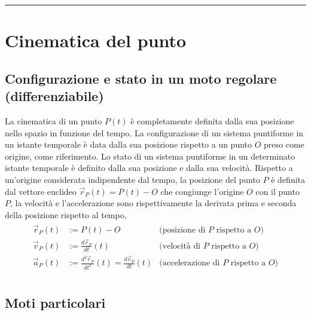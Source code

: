 \documentclass[letterpaper,10pt,italian]{jupyterBook}
\begin{document}
\bigskip\hrule\bigskip


\sphinxstepscope




\section{Cinematica del punto}
\label{\detokenize{ch/mechanics/kinematics-point:cinematica-del-punto}}\label{\detokenize{ch/mechanics/kinematics-point:physics-hs-mechanics-kinematics-point}}\label{\detokenize{ch/mechanics/kinematics-point::doc}}



\subsection{Configurazione e stato in un moto regolare (differenziabile)}
\label{\detokenize{ch/mechanics/kinematics-point:configurazione-e-stato-in-un-moto-regolare-differenziabile}}
\sphinxAtStartPar
La cinematica di un punto \(P(t)\) è completamente definita dalla sua posizione nello spazio in funzione del tempo. La configurazione di un sistema puntiforme in un istante temporale è data dalla sua posizione rispetto a un punto \(O\) preso come origine, come riferimento. Lo stato di un sistema puntiforme in un determinato istante temporale è definito dalla sua posizione e dalla sua velocità. Rispetto a un’origine considerata indipendente dal tempo, la posizione del punto \(P\) è definita dal vettore euclideo \(\vec{r}_P(t) = P(t) - O\) che congiunge l’origine \(O\) con il punto \(P\), la velocità e l’accelerazione sono rispettivamente la derivata prima e seconda della posizione rispetto al tempo,
\begin{equation*}
\begin{split}\begin{aligned}
   \vec{r}_P(t) & := P(t) - O & \text{(posizione di $P$ rispetto a $O$)} \\
   \vec{v}_P(t) & := \frac{d \vec{r}_P}{dt}(t) & \text{(velocità di $P$ rispetto a $O$)} \\
   \vec{a}_P(t) & := \frac{d^2 \vec{r}_P}{dt^2}(t) = \frac{d \vec{v}_P}{dt}(t) & \text{(accelerazione di $P$ rispetto a $O$)} \\
\end{aligned}\end{split}
\end{equation*}

\subsection{Moti particolari}
\label{\detokenize{ch/mechanics/kinematics-point:moti-particolari}}\label{\detokenize{ch/mechanics/kinematics-point:physics-hs-mechanics-kinematics-point-motion}}
\end{document}

